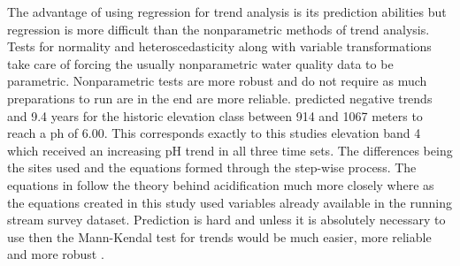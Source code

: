 The advantage of using regression for trend analysis is its prediction abilities but regression is more difficult than the nonparametric methods of trend analysis.  Tests for normality and heteroscedasticity along with variable transformations take care of forcing the usually nonparametric water quality data to be parametric.  Nonparametric tests are more robust and do not require as much preparations to run are in the end are more reliable.  \citet{robinson2008ph} predicted negative trends and 9.4 years for the historic elevation class between 914 and 1067 meters to reach a ph of 6.00.  This corresponds exactly to this studies elevation band 4 which received an increasing pH trend in all three time sets.  The differences being the sites used and the equations formed through the step-wise process.  The equations in \citet{robinson2008ph} follow the theory behind acidification much more closely where as the equations created in this study used variables already  available in the running stream survey dataset.  Prediction is hard and unless it is absolutely necessary to use then the Mann-Kendal test for trends would be much easier, more reliable and more robust \citep{helsel1992statistical}.	
